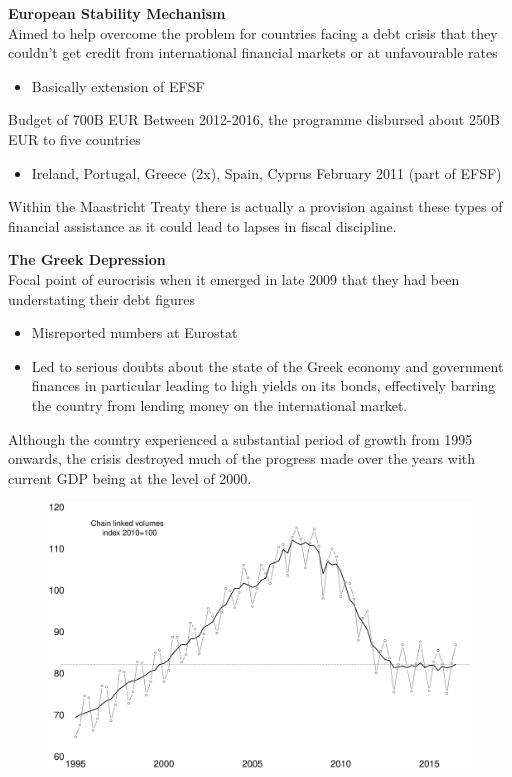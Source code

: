 \documentclass{beamer}
\begin{document}
\begin{frame}
  \textbf{European Stability Mechanism}\\
  Aimed to help overcome the problem for countries facing a debt crisis that they couldn't get credit from international financial markets or at unfavourable rates
  \begin{itemize}
    \item Basically extension of EFSF
  \end{itemize}
  Budget of 700B EUR
  Between 2012-2016, the programme disbursed about 250B EUR to five countries
\begin{itemize}
  \item Ireland, Portugal, Greece (2x), Spain, Cyprus February 2011 (part of EFSF)
\end{itemize}
Within the Maastricht Treaty there is actually a provision against these types of financial assistance as it could lead to lapses in fiscal discipline. 
\end{frame}

\begin{frame}
  \textbf{The Greek Depression}\\
  Focal point of eurocrisis when it emerged in late 2009 that they had been understating their debt figures
  \begin{itemize}
    \item Misreported numbers at Eurostat
    \item Led to serious doubts about the state of the Greek economy and government finances in particular leading to high yields on its bonds, effectively barring the country from lending money on the international market.
  \end{itemize}
  \medskip
  Although the country experienced a substantial period of growth from 1995 onwards, the crisis destroyed much of the progress made over the years with current GDP being at the level of 2000.
\end{frame}

\begin{frame}
  \begin{figure}
    \includegraphics[scale=.3]{greece1.eps}
  \end{figure}
\end{frame}
\end{document}
